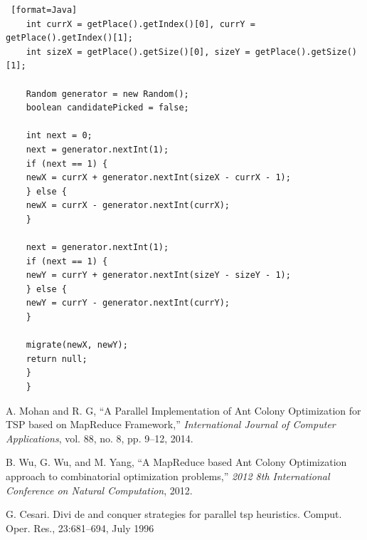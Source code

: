 \documentclass[11pt, letterpaper]{article}
\begin{document}
\begin{lstlisting} [format=Java]
	int currX = getPlace().getIndex()[0], currY = getPlace().getIndex()[1];
	int sizeX = getPlace().getSize()[0], sizeY = getPlace().getSize()[1];
	
	Random generator = new Random();
	boolean candidatePicked = false;
	
	int next = 0;
	next = generator.nextInt(1);
	if (next == 1) {
	newX = currX + generator.nextInt(sizeX - currX - 1);
	} else {
	newX = currX - generator.nextInt(currX);
	}
	
	next = generator.nextInt(1);
	if (next == 1) {
	newY = currY + generator.nextInt(sizeY - sizeY - 1);
	} else {
	newY = currY - generator.nextInt(currY);
	}
	
	migrate(newX, newY);
	return null;
	}
	}
	\end{lstlisting}
	\newpage
	\begin{thebibliography}{9}
		
		A. Mohan and R. G, “A Parallel Implementation of Ant Colony Optimization for TSP based on MapReduce Framework,” \textit{International Journal of Computer Applications}, vol. 88, no. 8, pp. 9–12, 2014.
		
		B. Wu, G. Wu, and M. Yang, “A MapReduce based Ant Colony Optimization approach to combinatorial optimization problems,” \textit{2012 8th International Conference on Natural Computation}, 2012.
		
		G. Cesari. Divi de and conquer strategies for parallel tsp heuristics.
		Comput. Oper. Res., 23:681–694, July 1996
		
	\end{thebibliography}
	
\end{document}
